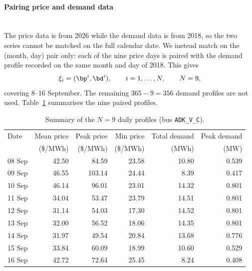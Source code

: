 
\paragraph{Pairing price and demand data}
\mbox{}\\

The price data is from 2026 while the demand data is from 2018, so the two series
cannot be matched on the full calendar date. We instead match on the (month, day)
pair only: each of the nine price days is paired with the demand profile recorded
on the same month and day of 2018. This gives
\begin{equation}
    \xi_i = (\bp^i, \bd^i), \qquad i=1,\dots,N, \qquad N = 9,
\end{equation}
covering 8--16 September. The remaining $365-9=356$ demand profiles are not used.
Table~\ref{tab:profiles} summarises the nine paired profiles.

\begin{table}[h]
  \centering
  \caption{Summary of the $N=9$ daily profiles (bus \texttt{ADK\_V\_C}).}
  \label{tab:profiles}
  \begin{tabular}{l|rrr|rr}
    \hline
    Date & Mean price & Peak price & Min price & Total demand & Peak demand \\
         & (\$/MWh)   & (\$/MWh)   & (\$/MWh)  & (MWh)        & (MW)        \\
    \hline
    08 Sep & 42.50 &  84.59 & 23.58 & 10.80 & 0.539 \\
    09 Sep & 46.55 & 103.14 & 24.44 &  8.39 & 0.417 \\
    10 Sep & 46.14 &  96.01 & 23.01 & 14.32 & 0.801 \\
    11 Sep & 34.04 &  53.47 & 23.79 & 14.51 & 0.801 \\
    12 Sep & 31.14 &  54.03 & 17.30 & 14.52 & 0.801 \\
    13 Sep & 32.00 &  56.52 & 18.06 & 14.35 & 0.801 \\
    14 Sep & 31.97 &  49.54 & 20.84 & 13.68 & 0.776 \\
    15 Sep & 33.84 &  60.09 & 18.99 & 10.60 & 0.529 \\
    16 Sep & 42.72 &  72.64 & 25.45 &  8.24 & 0.408 \\
    \hline
  \end{tabular}
\end{table}

